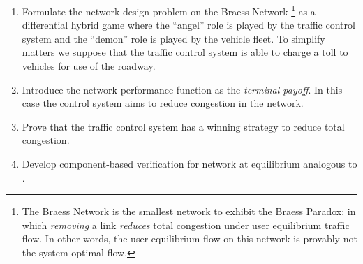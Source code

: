 \begin{enumerate}
    \item Formulate the network design problem on the Braess Network
    \footnote{The Braess Network \citep{frank1981braess} is the smallest network to exhibit the Braess Paradox: in which \textit{removing} a link \textit{reduces} total congestion under user equilibrium traffic flow.
    In other words, the user equilibrium flow on this network is provably not the system optimal flow.}
    as a differential hybrid game where the ``angel'' role is played by the traffic control system and the ``demon'' role is played by the vehicle fleet.
    To simplify matters we suppose that the traffic control system is able to charge a toll to vehicles for use of the roadway.
    \item Introduce the network performance function as the \textit{terminal payoff}.
    In this case the control system aims to reduce congestion in the network.
    \item Prove that the traffic control system has a winning strategy to reduce total congestion.
    \item Develop component-based verification for network at equilibrium analogous to \citet{DBLP:conf/itsc/MullerMP15}.
\end{enumerate}
